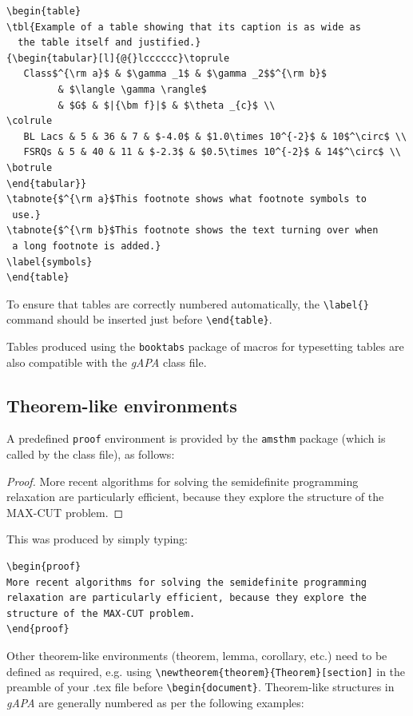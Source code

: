 \documentclass{gAPA2e}
\theoremstyle{plain}
\theoremstyle{remark}
\theoremstyle{definition}
\begin{document}
\begin{verbatim}
\begin{table}
\tbl{Example of a table showing that its caption is as wide as 
  the table itself and justified.}
{\begin{tabular}[l]{@{}lcccccc}\toprule
   Class$^{\rm a}$ & $\gamma _1$ & $\gamma _2$$^{\rm b}$
         & $\langle \gamma \rangle$
         & $G$ & $|{\bm f}|$ & $\theta _{c}$ \\
\colrule
   BL Lacs & 5 & 36 & 7 & $-4.0$ & $1.0\times 10^{-2}$ & 10$^\circ$ \\
   FSRQs & 5 & 40 & 11 & $-2.3$ & $0.5\times 10^{-2}$ & 14$^\circ$ \\
\botrule
\end{tabular}}
\tabnote{$^{\rm a}$This footnote shows what footnote symbols to 
 use.}
\tabnote{$^{\rm b}$This footnote shows the text turning over when
 a long footnote is added.}
\label{symbols}
\end{table}
\end{verbatim}

To ensure that tables are correctly numbered automatically,
the \verb"\label{}" command should be inserted just before \verb"\end{table}".

Tables produced using the \texttt{booktabs} package of macros for typesetting tables are also compatible with the \textit{gAPA} class file.


\subsection{Theorem-like environments}

A predefined \verb"proof" environment is provided by the \texttt{amsthm} package (which is called by the class file), as follows:

\begin{proof}
More recent algorithms for solving the semidefinite programming relaxation are
particularly efficient, because they explore the structure of the MAX-CUT problem.
\end{proof}
\noindent This was produced by simply typing:
%
\begin{verbatim}
\begin{proof}
More recent algorithms for solving the semidefinite programming
relaxation are particularly efficient, because they explore the
structure of the MAX-CUT problem.
\end{proof}
\end{verbatim}
%
Other theorem-like environments (theorem, lemma, corollary, etc.) need to be defined as required, e.g. using \verb"\newtheorem{theorem}{Theorem}[section]" in the preamble of your .tex file before \verb"\begin{document}". Theorem-like structures in \textit{gAPA} are generally numbered as per the following examples:
\end{document}
